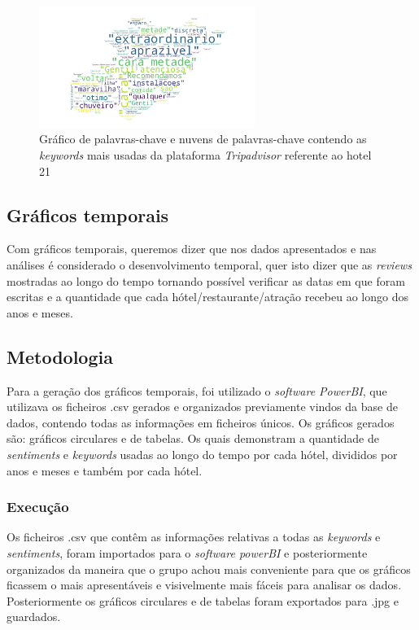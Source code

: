 \begin{figure}[!htb]
\centering
\includegraphics[width=7cm]{figuras/TripAdvisor/Hotels/hotel21_keywordcloud.jpeg}
\caption{Gráfico de palavras-chave e nuvens de palavras-chave contendo as \textit{keywords} mais usadas da plataforma \textit{Tripadvisor} referente ao hotel 21}
\label{fig:exemplofig21cloudTrip}
\end{figure}


\subsection{Gráficos temporais}

Com gráficos temporais, queremos dizer que nos dados apresentados e nas análises é considerado o desenvolvimento temporal, quer isto dizer que as \textit{reviews} mostradas ao longo do tempo tornando possível verificar as datas em que foram escritas e a quantidade que cada hótel/restaurante/atração recebeu ao longo dos anos e meses.

\subsection{Metodologia}

Para a geração dos gráficos temporais, foi utilizado o \textit{software PowerBI}, que utilizava os ficheiros .csv gerados e organizados previamente vindos da base de dados, contendo todas as informações em ficheiros únicos.
Os gráficos gerados são: gráficos circulares e de tabelas. Os quais demonstram a quantidade de \textit{sentiments} e \textit{keywords} usadas ao longo do tempo por cada hótel, divididos por anos e meses e também por cada hótel.

\subsubsection{Execução}

Os ficheiros .csv que contêm as informações relativas a todas as \textit{keywords} e \textit{sentiments}, foram importados para o \textit{software powerBI} e posteriormente organizados da maneira que o grupo achou mais conveniente para que os gráficos ficassem o mais apresentáveis e visivelmente mais fáceis para analisar os dados. Posteriormente os gráficos circulares e de tabelas foram exportados para .jpg e guardados. 

